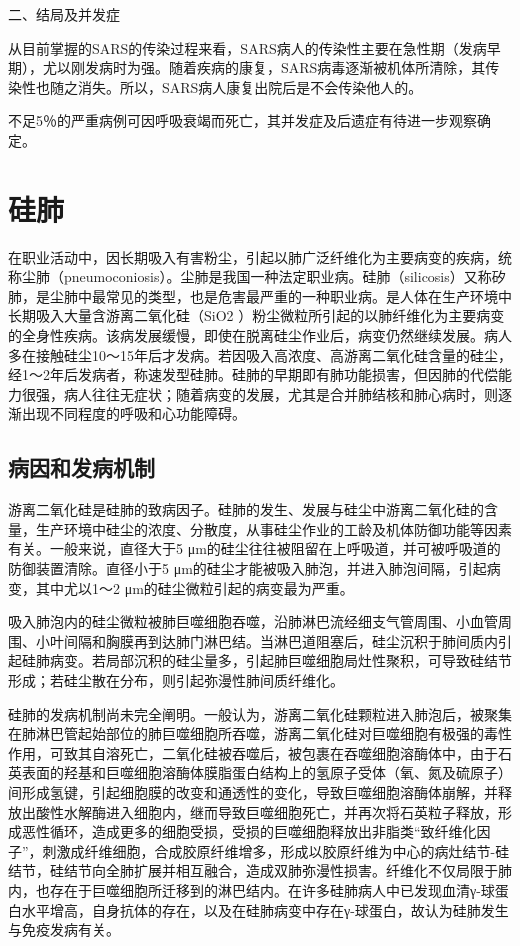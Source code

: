 二、结局及并发症

从目前掌握的SARS的传染过程来看，SARS病人的传染性主要在急性期（发病早期），尤以刚发病时为强。随着疾病的康复，SARS病毒逐渐被机体所清除，其传染性也随之消失。所以，SARS病人康复出院后是不会传染他人的。

不足5％的严重病例可因呼吸衰竭而死亡，其并发症及后遗症有待进一步观察确定。

\section{硅肺}

在职业活动中，因长期吸入有害粉尘，引起以肺广泛纤维化为主要病变的疾病，统称尘肺（pneumoconiosis）。尘肺是我国一种法定职业病。硅肺（silicosis）又称矽肺，是尘肺中最常见的类型，也是危害最严重的一种职业病。是人体在生产环境中长期吸入大量含游离二氧化硅（SiO{2}
）粉尘微粒所引起的以肺纤维化为主要病变的全身性疾病。该病发展缓慢，即使在脱离硅尘作业后，病变仍然继续发展。病人多在接触硅尘10～15年后才发病。若因吸入高浓度、高游离二氧化硅含量的硅尘，经1～2年后发病者，称速发型硅肺。硅肺的早期即有肺功能损害，但因肺的代偿能力很强，病人往往无症状；随着病变的发展，尤其是合并肺结核和肺心病时，则逐渐出现不同程度的呼吸和心功能障碍。

\subsection{病因和发病机制}

游离二氧化硅是硅肺的致病因子。硅肺的发生、发展与硅尘中游离二氧化硅的含量，生产环境中硅尘的浓度、分散度，从事硅尘作业的工龄及机体防御功能等因素有关。一般来说，直径大于5
μm的硅尘往往被阻留在上呼吸道，并可被呼吸道的防御装置清除。直径小于5
μm的硅尘才能被吸入肺泡，并进入肺泡间隔，引起病变，其中尤以1～2
μm的硅尘微粒引起的病变最为严重。

吸入肺泡内的硅尘微粒被肺巨噬细胞吞噬，沿肺淋巴流经细支气管周围、小血管周围、小叶间隔和胸膜再到达肺门淋巴结。当淋巴道阻塞后，硅尘沉积于肺间质内引起硅肺病变。若局部沉积的硅尘量多，引起肺巨噬细胞局灶性聚积，可导致硅结节形成；若硅尘散在分布，则引起弥漫性肺间质纤维化。

硅肺的发病机制尚未完全阐明。一般认为，游离二氧化硅颗粒进入肺泡后，被聚集在肺淋巴管起始部位的肺巨噬细胞所吞噬，游离二氧化硅对巨噬细胞有极强的毒性作用，可致其自溶死亡，二氧化硅被吞噬后，被包裹在吞噬细胞溶酶体中，由于石英表面的羟基和巨噬细胞溶酶体膜脂蛋白结构上的氢原子受体（氧、氮及硫原子）间形成氢键，引起细胞膜的改变和通透性的变化，导致巨噬细胞溶酶体崩解，并释放出酸性水解酶进入细胞内，继而导致巨噬细胞死亡，并再次将石英粒子释放，形成恶性循环，造成更多的细胞受损，受损的巨噬细胞释放出非脂类“致纤维化因子”，刺激成纤维细胞，合成胶原纤维增多，形成以胶原纤维为中心的病灶结节-硅结节，硅结节向全肺扩展并相互融合，造成双肺弥漫性损害。纤维化不仅局限于肺内，也存在于巨噬细胞所迁移到的淋巴结内。在许多硅肺病人中已发现血清γ-球蛋白水平增高，自身抗体的存在，以及在硅肺病变中存在γ-球蛋白，故认为硅肺发生与免疫发病有关。


